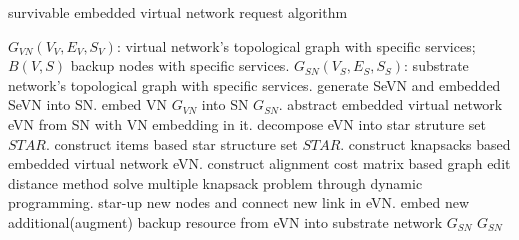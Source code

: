 \begin{algorithm}
\caption{survivable embedded virtual network request algorithm}
\label{alg:SeVNAlg}
\begin{algorithmic}[1]
\REQUIRE $G_{VN}(V_V,E_V,S_V)$: virtual network's topological graph with specific services; $B(V,S)$ backup nodes with specific services. $G_{SN}(V_S,E_S,S_S)$: substrate network's topological graph with specific services.
\ENSURE generate SeVN and embedded SeVN into SN.
\STATE embed VN $G_{VN}$ into SN $G_{SN}$.
\STATE abstract embedded virtual network eVN from SN with VN embedding in it.
\STATE decompose eVN into star struture set $STAR$.
\STATE construct items based star structure set $STAR$.
\STATE construct knapsacks based embedded virtual network eVN.
\STATE construct alignment cost matrix based graph edit distance method\cite{sanfeliu1983distance}
\STATE solve multiple knapsack problem through dynamic programming.
\STATE star-up new nodes and connect new link in eVN.
\STATE embed new additional(augment) backup resource from eVN into substrate network $G_{SN}$
\ENDFOR
\RETURN $G_{SN}$
\end{algorithmic}
\end{algorithm}





